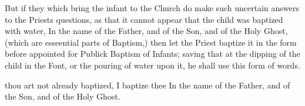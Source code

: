 \begin{rubric}
But if they which bring the infant to the Church do make such uncertain answers to the Priests questions, as that it cannot appear that the child was baptized with water, In the name of the Father, and of the Son, and of the Holy Ghost, (which are esseential parts of Baptism,) then let the Priest baptize it in the form before appointed for Publick Baptism of Infants; saving that at the dipping of the child in the Font, or the pouring of water upon it, he shall use this form of words.
\end{rubric}

 thou art not already baptized,  I baptize thee In the name of the Father, and of the Son, and of the Holy Ghost.
